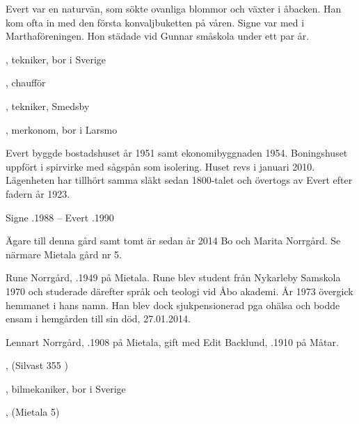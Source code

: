 Evert var en naturvän, som sökte ovanliga blommor och växter i åbacken. Han kom ofta in med den första konvaljbuketten på våren. Signe var med i Marthaföreningen. Hon städade vid Gunnar småskola under ett par år.
\begin{jhchildren}
  \item {}, tekniker, bor i Sverige
  \item {}, chaufför
  \item {}, tekniker, Smedsby
  \item {}, merkonom, bor i Larsmo
\end{jhchildren}
Evert byggde bostadshuset år 1951 samt ekonomibyggnaden 1954. Boningshuset uppfört i spirvirke med sågspån som isolering. Huset revs i januari 2010. Lägenheten har tillhört samma släkt sedan 1800-talet och övertogs av Evert efter fadern år 1923.

Signe .1988	--	Evert .1990





Ägare till denna gård samt tomt är sedan år 2014 Bo och Marita Norrgård. Se närmare Mietala gård nr 5.\jhvspace{}



Rune Norrgård, .1949 på Mietala. Rune blev student från Nykarleby Samskola 1970 och studerade därefter språk och teologi vid Åbo akademi. År 1973 övergick hemmanet i hans namn. Han blev dock sjukpensionerad pga ohälsa och bodde ensam i hemgården till sin död, 27.01.2014.


Lennart Norrgård, .1908 på Mietala, gift med Edit Backlund,	.1910 på Måtar.
\begin{jhchildren}
  \item {}, (Silvast 355 )
  \item {}, bilmekaniker, bor i Sverige
  \item {}, (Mietala 5)
  \item {}
\end{jhchildren}

